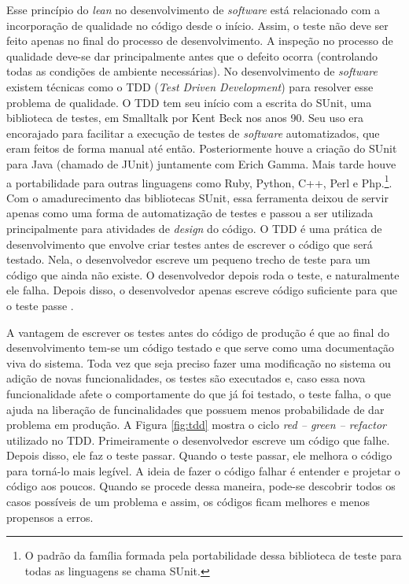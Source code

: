 Esse princípio do \textit{lean} no desenvolvimento de \textit{software} está relacionado com a incorporação de qualidade no código desde o início. Assim, o teste não deve ser feito apenas no final do processo de desenvolvimento. A inspeção no processo de qualidade deve-se dar principalmente antes que o defeito ocorra (controlando todas as condições de ambiente necessárias). 
No desenvolvimento de \textit{software} existem técnicas como o TDD (\textit{Test Driven Development}) para resolver esse problema de qualidade. 	
O TDD tem seu início com a escrita do SUnit, uma biblioteca de testes, em Smalltalk por Kent Beck nos anos 90. Seu uso era encorajado para facilitar a execução de testes de \textit{software} automatizados, que eram feitos de forma manual até então. Posteriormente houve a criação do SUnit para Java (chamado de JUnit) juntamente com Erich Gamma. Mais tarde houve a portabilidade para outras linguagens como Ruby, Python, C++, Perl e Php.\footnote{O padrão da família formada pela portabilidade dessa biblioteca de teste para todas as linguagens se chama SUnit.}. Com o amadurecimento das bibliotecas SUnit, essa ferramenta deixou de servir apenas como uma forma de automatização de testes e passou a ser utilizada principalmente para atividades de \textit{design} do código. O TDD é uma prática de desenvolvimento que envolve criar testes antes de escrever o código que será testado. Nela, o desenvolvedor escreve um pequeno trecho de teste para um código que ainda não existe. O desenvolvedor depois roda o teste, e naturalmente ele falha. Depois disso, o desenvolvedor apenas escreve código suficiente para que o teste passe \cite{barauna:13}.

A vantagem de escrever os testes antes do código de produção é que ao final do desenvolvimento tem-se um código testado e que serve como uma documentação viva do sistema. Toda vez que seja preciso fazer uma modificação no sistema ou adição de novas funcionalidades, os testes são executados e, caso essa nova funcionalidade afete o comportamente do que já foi testado, o teste falha, o que ajuda na liberação de funcinalidades que possuem menos probabilidade de dar problema em produção. A Figura \ref{fig:tdd} mostra o ciclo \textit{red -- green -- refactor} utilizado no TDD. Primeiramente o desenvolvedor escreve um código que falhe. Depois disso, ele faz o teste passar. Quando o teste passar, ele melhora o código para torná-lo mais legível. A ideia de fazer o código falhar é entender e projetar o código aos poucos. Quando se procede dessa maneira, pode-se descobrir todos os casos possíveis de um problema e assim, os códigos ficam melhores e menos propensos a erros.

